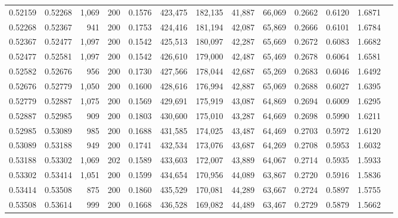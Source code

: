 \begin{tabular}{rrrrrrrrrrrrr}
0.52159 & 0.52268 & 1,069 & 200 &                                     0.1576 & 423,475 & 182,135 &  41,887 &  66,069 & 0.2662 & 0.6120 & 1.6871 \\
0.52268 & 0.52367 &   941 & 200 &                                     0.1753 & 424,416 & 181,194 &  42,087 &  65,869 & 0.2666 & 0.6101 & 1.6784 \\
0.52367 & 0.52477 & 1,097 & 200 &                                     0.1542 & 425,513 & 180,097 &  42,287 &  65,669 & 0.2672 & 0.6083 & 1.6682 \\
0.52477 & 0.52581 & 1,097 & 200 &                                     0.1542 & 426,610 & 179,000 &  42,487 &  65,469 & 0.2678 & 0.6064 & 1.6581 \\
0.52582 & 0.52676 &   956 & 200 &                                     0.1730 & 427,566 & 178,044 &  42,687 &  65,269 & 0.2683 & 0.6046 & 1.6492 \\
0.52676 & 0.52779 & 1,050 & 200 &                                     0.1600 & 428,616 & 176,994 &  42,887 &  65,069 & 0.2688 & 0.6027 & 1.6395 \\
0.52779 & 0.52887 & 1,075 & 200 &                                     0.1569 & 429,691 & 175,919 &  43,087 &  64,869 & 0.2694 & 0.6009 & 1.6295 \\
0.52887 & 0.52985 &   909 & 200 &                                     0.1803 & 430,600 & 175,010 &  43,287 &  64,669 & 0.2698 & 0.5990 & 1.6211 \\
0.52985 & 0.53089 &   985 & 200 &                                     0.1688 & 431,585 & 174,025 &  43,487 &  64,469 & 0.2703 & 0.5972 & 1.6120 \\
0.53089 & 0.53188 &   949 & 200 &                                     0.1741 & 432,534 & 173,076 &  43,687 &  64,269 & 0.2708 & 0.5953 & 1.6032 \\
0.53188 & 0.53302 & 1,069 & 202 &                                     0.1589 & 433,603 & 172,007 &  43,889 &  64,067 & 0.2714 & 0.5935 & 1.5933 \\
0.53302 & 0.53414 & 1,051 & 200 &                                     0.1599 & 434,654 & 170,956 &  44,089 &  63,867 & 0.2720 & 0.5916 & 1.5836 \\
0.53414 & 0.53508 &   875 & 200 &                                     0.1860 & 435,529 & 170,081 &  44,289 &  63,667 & 0.2724 & 0.5897 & 1.5755 \\
0.53508 & 0.53614 &   999 & 200 &                                     0.1668 & 436,528 & 169,082 &  44,489 &  63,467 & 0.2729 & 0.5879 & 1.5662 \\

\end{tabular}
